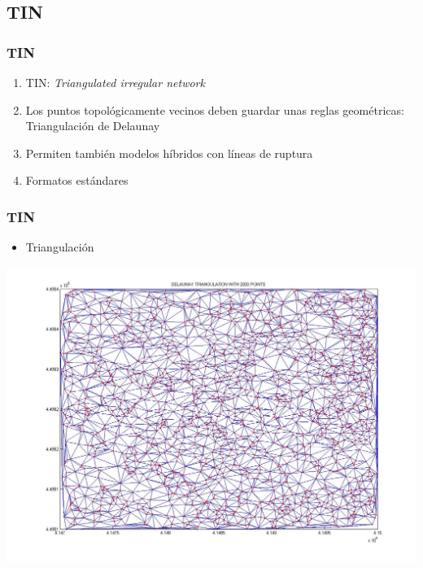 \subsection{TIN}
\begin{frame}
  \frametitle{TIN}
  \begin{enumerate}
    \item \alert{TIN}: \emph{Triangulated irregular network}
    \item Los puntos topológicamente vecinos deben guardar unas reglas
      geométricas: \alert{Triangulación de Delaunay}
    \item Permiten también modelos híbridos con líneas de ruptura
    \item Formatos estándares
  \end{enumerate}
\end{frame}
\begin{frame}
  \frametitle{TIN}
  \begin{itemize}
    \item Triangulación
  \end{itemize}
  \begin{center}
        \includegraphics[height=0.60\textheight]{images/triangulacion}
  \end{center}
\end{frame}
